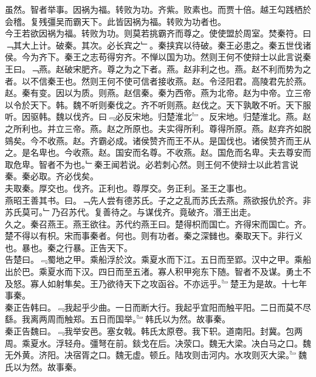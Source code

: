 \documentclass{zhvt-classic}
\begin{document}
\hspace*{2em}虽然。智者举事。因祸为福。转败为功。齐紫。败素也。而贾十倍。越王勾践栖於会稽。复残彊吴而霸天下。此皆因祸为福。转败为功者也。\\
\hspace*{2em}今王若欲因祸为福。转败为功。则莫若挑霸齐而尊之。使使盟於周室。焚秦符。曰﹁其大上计。破秦。其次。必长宾之﹂。秦挟宾以待破。秦王必患之。秦五世伐诸侯。今为齐下。秦王之志苟得穷齐。不惮以国为功。然则王何不使辩士以此言说秦王曰。﹁燕。赵破宋肥齐。尊之为之下者。燕。赵非利之也。燕。赵不利而势为之者。以不信秦王也。然则王何不使可信者接收燕。赵。令泾阳君。高陵君先於燕。赵。秦有变。因以为质。则燕。赵信秦。秦为西帝。燕为北帝。赵为中帝。立三帝以令於天下。韩。魏不听则秦伐之。齐不听则燕。赵伐之。天下孰敢不听。天下服听。因驱韩。魏以伐齐。曰﹃必反宋地。归楚淮北﹄。反宋地。归楚淮北。燕。赵之所利也。并立三帝。燕。赵之所原也。夫实得所利。尊得所原。燕。赵弃齐如脱鵕矣。今不收燕。赵。齐霸必成。诸侯赞齐而王不从。是国伐也。诸侯赞齐而王从之。是名卑也。今收燕。赵。国安而名尊。不收燕。赵。国危而名卑。夫去尊安而取危卑。智者不为也。﹂秦王闻若说。必若刺心然。则王何不使辩士以此若言说秦。秦必取。齐必伐矣。\\
\hspace*{2em}夫取秦。厚交也。伐齐。正利也。尊厚交。务正利。圣王之事也。\\
\hspace*{2em}燕昭王善其书。曰。﹁先人尝有德苏氏。子之之乱而苏氏去燕。燕欲报仇於齐。非苏氏莫可。﹂乃召苏代。复善待之。与谋伐齐。竟破齐。湣王出走。\\
\hspace*{2em}久之。秦召燕王。燕王欲往。苏代约燕王曰。楚得枳而国亡。齐得宋而国亡。齐。楚不得以有枳。宋而事秦者。何也。则有功者。秦之深雠也。秦取天下。非行义也。暴也。秦之行暴。正告天下。\\
\hspace*{2em}告楚曰。﹃蜀地之甲。乘船浮於汶。乘夏水而下江。五日而至郢。汉中之甲。乘船出於巴。乘夏水而下汉。四日而至五渚。寡人积甲宛东下随。智者不及谋。勇土不及怒。寡人如射隼矣。王乃欲待天下之攻函谷。不亦远乎。﹄楚王为是故。十七年事秦。\\
\hspace*{2em}秦正告韩曰。﹃我起乎少曲。一日而断大行。我起乎宜阳而触平阳。二日而莫不尽繇。我离两周而触郑。五日而国举。﹄韩氏以为然。故事秦。\\
\hspace*{2em}秦正告魏曰。﹃我举安邑。塞女戟。韩氏太原卷。我下轵。道南阳。封冀。包两周。乘夏水。浮轻舟。彊弩在前。錟戈在后。决荥口。魏无大梁。决白马之口。魏无外黄。济阳。决宿胥之口。魏无虚。顿丘。陆攻则击河内。水攻则灭大梁。﹄魏氏以为然。故事秦。\\
\end{document}
